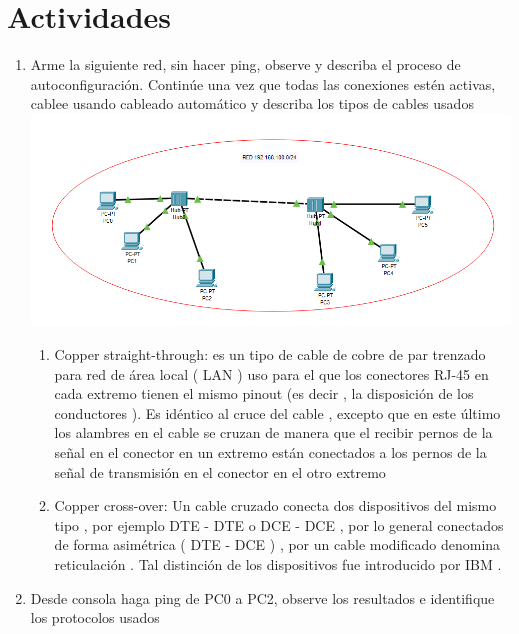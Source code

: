 \documentclass[11pt]{article}
\begin{document}
\newpage																
 
\section{Actividades}
\begin{enumerate}
    \item Arme la siguiente red, sin hacer ping, observe y describa el proceso de autoconfiguración. Continúe una vez que todas las conexiones estén activas, cablee usando cableado automático y describa los tipos de cables usados\\
    \includegraphics[scale=0.5]{Act/1.PNG}
    \begin{enumerate}
        \item Copper straight-through: es un tipo de cable de cobre de par trenzado para red de área local ( LAN ) uso para el que los conectores RJ-45 en cada extremo tienen el mismo pinout (es decir , la disposición de los conductores ). Es idéntico al cruce del cable , excepto que en este último los alambres en el cable se cruzan de manera que el recibir pernos de la señal en el conector en un extremo están conectados a los pernos de la señal de transmisión en el conector en el otro extremo
        \item Copper cross-over: Un cable cruzado conecta dos dispositivos del mismo tipo , por ejemplo DTE - DTE o DCE - DCE , por lo general conectados de forma asimétrica ( DTE - DCE ) , por un cable modificado denomina reticulación . Tal distinción de los dispositivos fue introducido por IBM .
    \end{enumerate}
    \item Desde consola haga ping de PC0 a PC2, observe los resultados e identifique los protocolos usados
    

\end{enumerate}
\end{document}
